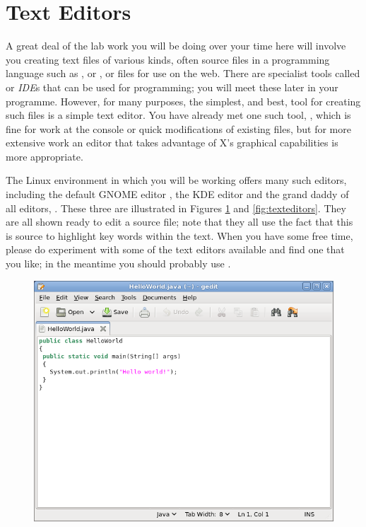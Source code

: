 \section{Text Editors}





A great deal of the lab work you will be doing over your time here
will involve you creating text files of various kinds, often source
files in a programming language such as ,  or
, or  files for use on the web. There are
specialist tools called
 or \emph{IDE}s that can be used for programming; you
will meet these later in your programme. However, for many purposes,
the simplest, and best, tool for creating such files is a simple text
editor. You have already met one such tool, , which is
fine for work at the console or quick modifications of existing files,
but for more extensive work an editor that takes advantage of X's
graphical capabilities is more appropriate.

The Linux environment in which you will be working offers many such
editors, including the default GNOME editor , the KDE
editor  and the grand daddy of all editors,
. These three are illustrated in Figures \ref{fig:gedit}
and \ref{fig:texteditors}. They are all shown ready to edit a
 source file; note that they all use the fact that this is
 source to highlight key words within the text. When you
have some free time, please do experiment with some of the text
editors available and find one that you like; in the meantime you
should probably use .

\begin{figure}
  \centering
\includegraphics[width=.7\textwidth]{images/gedit}  
  \caption{}
  \label{fig:gedit}
\end{figure}

